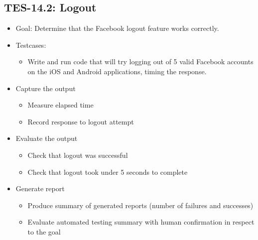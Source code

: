\subsection{TES-14.2: Logout}
\label{subsec:logout}
\begin{itemize}
\item Goal: Determine that the Facebook logout feature works correctly.

\item Testcases: 
\begin{itemize}
\item Write and run code that will try logging out of 5 valid Facebook accounts 
on the iOS and Android applications, timing the response.
\end{itemize}

\item Capture the output 
\begin{itemize}
\item Measure elapsed time 
\item Record response to logout attempt
\end{itemize}

\item Evaluate the output 
\begin{itemize}
\item Check that logout was successful
\item Check that logout took under 5 seconds to complete
\end{itemize}

\item Generate report 
\begin{itemize}
\item Produce summary of generated reports (number of failures and successes)
\item Evaluate automated testing summary with human confirmation in respect to the goal
\end{itemize}
\end{itemize}

